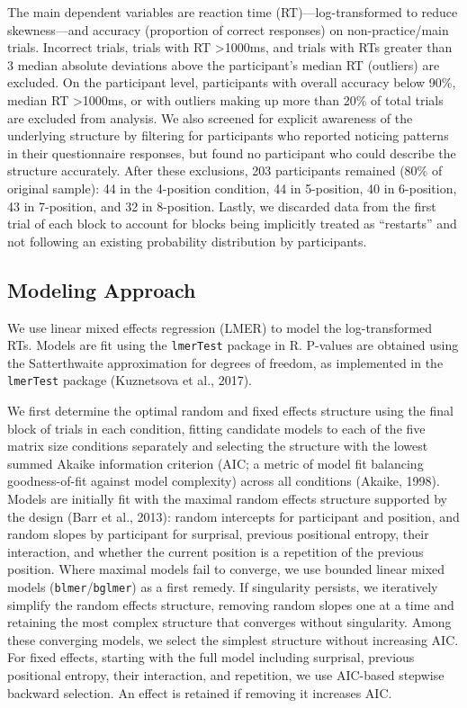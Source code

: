 \documentclass[
  10pt,
  letterpaper]{article}
\begin{document}
The main dependent variables are reaction time (RT)---log-transformed to
reduce skewness---and accuracy (proportion of correct responses) on
non-practice/main trials. Incorrect trials, trials with RT
\textgreater1000ms, and trials with RTs greater than 3 median absolute
deviations above the participant's median RT (outliers) are excluded. On
the participant level, participants with overall accuracy below 90\%,
median RT \textgreater1000ms, or with outliers making up more than 20\%
of total trials are excluded from analysis. We also screened for
explicit awareness of the underlying structure by filtering for
participants who reported noticing patterns in their questionnaire
responses, but found no participant who could describe the structure
accurately. After these exclusions, 203 participants remained (80\% of
original sample): 44 in the 4-position condition, 44 in 5-position, 40
in 6-position, 43 in 7-position, and 32 in 8-position. Lastly, we
discarded data from the first trial of each block to account for blocks
being implicitly treated as ``restarts'' and not following an existing
probability distribution by participants.

\subsection{Modeling Approach}\label{modeling-approach}

We use linear mixed effects regression (LMER) to model the
log-transformed RTs. Models are fit using the \texttt{lmerTest} package
in R. P-values are obtained using the Satterthwaite approximation for
degrees of freedom, as implemented in the \texttt{lmerTest} package
(Kuznetsova et al., 2017).

We first determine the optimal random and fixed effects structure using
the final block of trials in each condition, fitting candidate models to
each of the five matrix size conditions separately and selecting the
structure with the lowest summed Akaike information criterion (AIC; a
metric of model fit balancing goodness-of-fit against model complexity)
across all conditions (Akaike, 1998). Models are initially fit with the
maximal random effects structure supported by the design (Barr et al.,
2013): random intercepts for participant and position, and random slopes
by participant for surprisal, previous positional entropy, their
interaction, and whether the current position is a repetition of the
previous position. Where maximal models fail to converge, we use bounded
linear mixed models (\texttt{blmer}/\texttt{bglmer}) as a first remedy.
If singularity persists, we iteratively simplify the random effects
structure, removing random slopes one at a time and retaining the most
complex structure that converges without singularity. Among these
converging models, we select the simplest structure without increasing
AIC. For fixed effects, starting with the full model including
surprisal, previous positional entropy, their interaction, and
repetition, we use AIC-based stepwise backward selection. An effect is
retained if removing it increases AIC.
\end{document}
